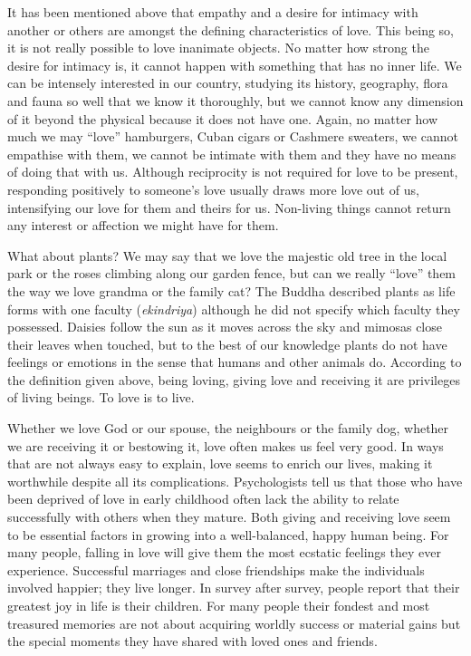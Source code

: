 \documentclass[10pt, openright]{book}
\begin{document}
It has been mentioned above that empathy and a desire for intimacy with another or others are amongst the defining characteristics of love. This being so, it is not really possible to love inanimate objects. No matter how strong the desire for intimacy is, it cannot happen with something that has no inner life. We can be intensely interested in our country, studying its history, geography, flora and fauna so well that we know it thoroughly, but we cannot know any dimension of it beyond the physical because it does not have one. Again, no matter how much we may “love” hamburgers, Cuban cigars or Cashmere sweaters, we cannot empathise with them, we cannot be intimate with them and they have no means of doing that with us. Although reciprocity is not required for love to be present, responding positively to someone’s love usually draws more love out of us, intensifying our love for them and theirs for us. Non-living things cannot return any interest or affection we might have for them.


What about plants? We may say that we love the majestic old tree in the local park or the roses climbing along our garden fence, but can we really “love” them the way we love grandma or the family cat? The Buddha described plants as life forms with one faculty (\textit{ekindriya}) although he did not specify which faculty they possessed. Daisies follow the sun as it moves across the sky and mimosas close their leaves when touched, but to the best of our knowledge plants do not have feelings or emotions in the sense that humans and other animals do. According to the definition given above, being loving, giving love and receiving it are privileges of living beings. To love is to live.


Whether we love God or our spouse, the neighbours or the family dog, whether we are receiving it or bestowing it, love often makes us feel very good. In ways that are not always easy to explain, love seems to enrich our lives, making it worthwhile despite all its complications. Psychologists tell us that those who have been deprived of love in early childhood often lack the ability to relate successfully with others when they mature. Both giving and receiving love seem to be essential factors in growing into a well-balanced, happy human being. For many people, falling in love will give them the most ecstatic feelings they ever experience. Successful marriages and close friendships make the individuals involved happier; they live longer. In survey after survey, people report that their greatest joy in life is their children. For many people their fondest and most treasured memories are not about acquiring worldly success or material gains but the special moments they have shared with loved ones and friends.
\end{document}
